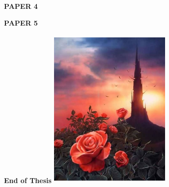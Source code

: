\documentclass[
  12pt,
]{book}
\begin{document}


\begin{center}
\textbf{\fontsize{70}{1} \selectfont PAPER 4}
\end{center}



\begin{center}
\textbf{\fontsize{70}{1} \selectfont PAPER 5}
\end{center}



\begin{center}
\textbf{\fontsize{70}{1} \selectfont End of Thesis}
\vfill
\includegraphics[width=6cm, height=8cm]{img/rose.jpg}
\end{center}
\thispagestyle{empty}

%
\end{document}
